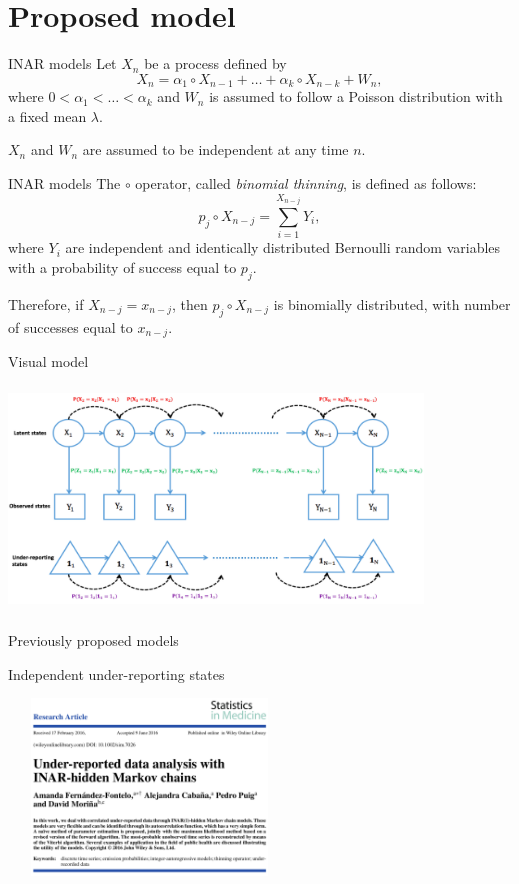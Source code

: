 \documentclass[aspectratio=169,usepdftitle=true]{beamer}
\begin{document}
\section{Proposed model}
\begin{frame}{INAR models}
Let $X_n$ be a process defined by
\begin{equation}
X_n = \alpha_1 \circ X_{n-1} + \ldots + \alpha_k \circ X_{n-k} + W_n,
\end{equation}
where $0 < \alpha_1 < \ldots < \alpha_k$ and $W_n$ is assumed to follow a Poisson
distribution with a fixed mean $\lambda$. 

$X_n$ and $W_n$ are assumed to be independent at any time $n$.
\end{frame}

\begin{frame}{INAR models}
The $\circ$ operator, called \textit{binomial thinning}, is defined as follows:
\begin{equation}
p_j \circ X_{n-j} = \sum_{i=1}^{X_{n-j}} Y_i,
\end{equation}
where $Y_i$ are independent and identically distributed Bernoulli random variables with a probability of
success equal to $p_j$. 

Therefore, if $X_{n-j}=x_{n-j}$, then $p_j \circ X_{n-j}$ is binomially distributed, with number of successes equal to $x_{n-j}$.
\end{frame}

\begin{frame}{Visual model}
\begin{center}
\includegraphics[height=6cm,width=11cm]{HMC.png}
\end{center}
\end{frame}

\begin{frame}[c]{Previously proposed models}
    \begin{block}{Independent under-reporting states}
        \begin{center}
           \includegraphics[height=4.7cm,width=7.5cm]{SiM1.png}
        \end{center}
    \end{block}
\end{frame}
\end{document}
